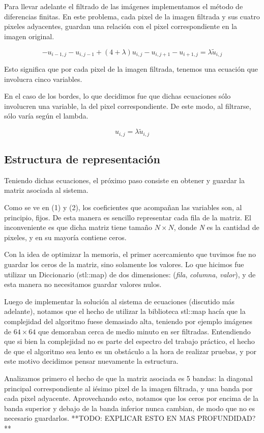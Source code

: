 \documentclass[a4paper]{article}
\begin{document}
Para llevar adelante el filtrado de las imágenes implementamos el método de diferencias finitas.
En este problema, cada pixel de la imagen filtrada y sus cuatro pixeles adyacentes, guardan una relación con el pixel correspondiente en la imagen original.

$$ -u_{i - 1, j} - u_{i, j - 1} + (4 + \lambda ) u_{i,j} - u_{i, j + 1} - u_{i + 1, j} = \lambda \tilde{u}_{i,j} $$

Esto significa que por cada pixel de la imagen filtrada, tenemos una ecuación que involucra cinco variables.

En el caso de los bordes, lo que decidimos fue que dichas ecuaciones sólo involucren una variable, la del pixel correspondiente. De este modo, al filtrarse, sólo varía según el lambda.

$$ u_{i,j} = \lambda \tilde{u}_{i,j} $$

\subsection{Estructura de representación}

Teniendo dichas ecuaciones, el próximo paso consiste en obtener y guardar la matriz asociada al sistema.

Como se ve en (1) y (2), los coeficientes que acompañan las variables son, al principio, fijos.
De esta manera es sencillo representar cada fila de la matriz. El inconveniente es que dicha matriz tiene tamaño $N \times N$, donde \textit{N} es la cantidad de pixeles, y en su mayoría contiene ceros.

Con la idea de optimizar la memoria, el primer acercamiento que tuvimos fue no guardar los ceros de la matriz, sino solamente los valores. Lo que hicimos fue utilizar un Diccionario (stl::map) de dos dimensiones: (\textit{fila}, \textit{columna}, \textit{valor}), y de esta manera no necesitamos guardar valores nulos.

Luego de implementar la solución al sistema de ecuaciones (discutido más adelante), notamos que el hecho de utilizar la biblioteca stl::map hacía que la complejidad del algoritmo fuese demasiado alta, teniendo por ejemplo imágenes de $64 \times 64$ que demoraban cerca de medio minuto en ser filtradas. Entendiendo que si bien la complejidad no es parte del espectro del trabajo práctico, el hecho de que el algoritmo sea lento es un obstáculo a la hora de realizar pruebas, y por este motivo decidimos pensar nuevamente la estructura.

Analizamos primero el hecho de que la matriz asociada es 5 bandas: la diagonal principal correspondiente al iésimo pixel de la imagen filtrada, y una banda por cada pixel adyacente.
Aprovechando esto, notamos que los ceros por encima de la banda superior y debajo de la banda inferior nunca cambian, de modo que no es necesario guardarlos. **TODO: EXPLICAR ESTO EN MAS PROFUNDIDAD?**
\end{document}
